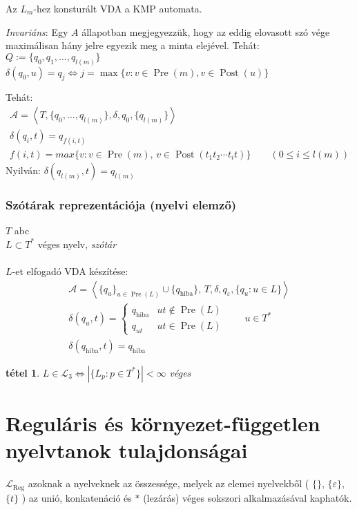 \documentclass[fleqn,10pt,a4paper]{article}
\renewcommand{\epsilon}{\varepsilon}
\theoremstyle{magyar}
\newtheorem{te}{tétel}[section]
\DeclareMathOperator{\pre}{Pre}
\DeclareMathOperator{\post}{Post}
\newcommand{\Lang}{\mathcal{L}}
\newcommand{\A}{\mathcal{A}}
\newcommand{\VDA}{\A}
\newcommand{\LangReg}{\Lang_{\text{Reg}}}
\begin{document}
  Az $L_m$-hez konsturált VDA a KMP automata.
  
  \emph{Invariáns}: Egy $A$ állapotban megjegyezzük, hogy az eddig elovasott szó vége maximálisan hány jelre egyezik meg
  a minta elejével. Tehát:\\
  $Q := \{ q_0, q_1, \ldots, q_{l(m)}\}$\\
  $\delta(q_0,u) = q_j \iff j = \max\{ v : v\in \pre(m), v \in \post(u)\}$
  
  Tehát:
  \begin{gather*}
    \mathcal A = \left<T, \{q_0,\ldots,q_{l(m)}\},\delta,q_0,\{q_{l(m)}\}\right>\\
    \delta(q_i,t) = q_{f(i,t)}\\
    f(i,t) = max\{ v : v\in \pre(m),\,v\in \post(t_1t_2\cdots t_i t)\} \qquad (0\leq i \leq l(m))
  \end{gather*}
  Nyilván:
  $\delta(q_{l(m)},t) = q_{l(m)}$


  \subsubsection{Szótárak reprezentációja (nyelvi elemző)}
  $T$ abc\\
  $L\subset T^*$ véges nyelv, \emph{szótár}\\\\
  $L$-et elfogadó VDA készítése:
  \begin{gather*}
    \VDA = \left< \{q_u\}_{u\in \pre(L)} \cup \{ q_{\text{hiba}}\},\, T,\delta,q_{\epsilon},\{q_u : u\in L\}\right>\\
    \delta(q_u,t) = \begin{cases}
      q_{\text{hiba}} & ut\not\in \pre(L)\\
      q_{ut} & ut \in \pre(L)
    \end{cases}\qquad u\in T^*\\
    \delta(q_{\text{hiba}},t) = q_{\text{hiba}}
  \end{gather*}
  \begin{te} $L\in \Lang_3\iff \left\vert\{L_p : p \in T^*\} \right\vert < \infty$ véges
  \end{te}


  \newpage
  \section{Reguláris és környezet-független nyelvtanok tulajdonságai}
  $\LangReg$ azoknak a nyelveknek az összessége, melyek az elemei nyelvekből ( $\{\}$, $\{\epsilon\}$, $\{t\}$ ) az
  unió, konkatenáció és $*$ (lezárás) véges sokszori alkalmazásával kaphatók.
  
\end{document}
